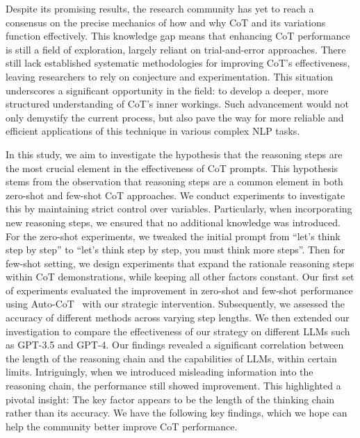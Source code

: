\documentclass[11pt]{article}
\begin{document}
Despite its promising results, the research community has yet to reach a consensus on the precise mechanics of how and why CoT and its variations function effectively. This knowledge gap means that enhancing CoT performance is still a field of exploration, largely reliant on trial-and-error approaches. There still lack established systematic methodologies for improving CoT's effectiveness, leaving researchers to rely on conjecture and experimentation. This situation underscores a significant opportunity in the field: to develop a deeper, more structured understanding of CoT's inner workings. Such advancement would not only demystify the current process, but also pave the way for more reliable and efficient applications of this technique in various complex NLP tasks.


In this study, we aim to investigate the hypothesis that the reasoning steps are the most crucial element in the effectiveness of CoT prompts. This hypothesis stems from the observation that reasoning steps are a common element in both zero-shot and few-shot CoT approaches. We conduct experiments to investigate this by maintaining strict control over variables. Particularly, when incorporating new reasoning steps, we ensured that no additional knowledge was introduced. For the zero-shot experiments, we tweaked the initial prompt from ``let's think step by step'' to ``let's think step by step, you must think more steps''. Then for few-shot setting, we design experiments that expand the rationale reasoning steps within CoT demonstrations, while keeping all other factors constant.
Our first set of experiments evaluated the improvement in zero-shot and few-shot performance using Auto-CoT~\cite{zhang2022automatic} with our strategic intervention. Subsequently, we assessed the accuracy of different methods across varying step lengths. We then extended our investigation to compare the effectiveness of our strategy on different LLMs such as GPT-3.5 and GPT-4. Our findings revealed a significant correlation between the length of the reasoning chain and the capabilities of LLMs, within certain limits. Intriguingly, when we introduced misleading information into the reasoning chain, the performance still showed improvement. This highlighted a pivotal insight: The key factor appears to be the length of the thinking chain rather than its accuracy.
We have the following key findings, which we hope can help the community better improve CoT performance.
\end{document}
